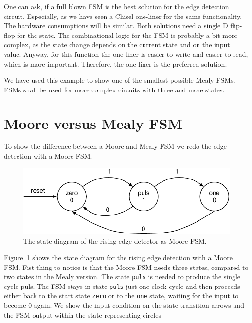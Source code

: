 \documentclass[%
    10pt,
    headinclude, footexclude,
    openright, %
    notitlepage,
    cleardoubleempty,
    headsepline,
    pointlessnumbers,
    bibtotoc, idxtotoc,
    ]{scrbook}
\newcommand{\code}[1]{{\small{\texttt{#1}}}}
\newcommand{\scale}{0.7}
\begin{document}
One can ask, if a full blown FSM is the best solution for the edge detection circuit.
Especially, as we have seen a Chisel one-liner for the same functionality.
The hardware consumptions will be similar. Both solutions need a single D flip-flop
for the state. The combinational logic for the FSM is probably a bit more complex, as
the state change depends on the current state and on the input value.
Anyway, for this function the one-liner is easier to write and easier to read,
which is more important. Therefore, the one-liner is the preferred solution.

We have used this example to show one of the smallest possible Mealy FSMs.
FSMs shall be used for more complex circuits with three and more states.

\section{Moore versus Mealy FSM}

To show the difference between a Moore and Mealy FSM we redo the edge
detection with a Moore FSM. 

\begin{figure}
  \centering
  \includegraphics[scale=\scale]{figures/state-diag-rising-moore}
  \caption{The state diagram of the rising edge detector as Moore FSM.}
  \label{fig:diag:rising:moore}
\end{figure}

Figure~\ref{fig:diag:rising:moore} shows the state diagram for the rising
edge detection with a Moore FSM. Fist thing to notice is that the Moore FSM
needs three states, compared to two states in the Mealy version.
The state \code{puls} is needed to produce the single cycle puls.
The FSM stays in state \code{puls} just one clock cycle and then
proceeds either back to the start state \code{zero} or to the \code{one}
state, waiting for the input to become 0 again.
We show the input condition on the state transition arrows and the
FSM output within the state representing circles.

\end{document}
